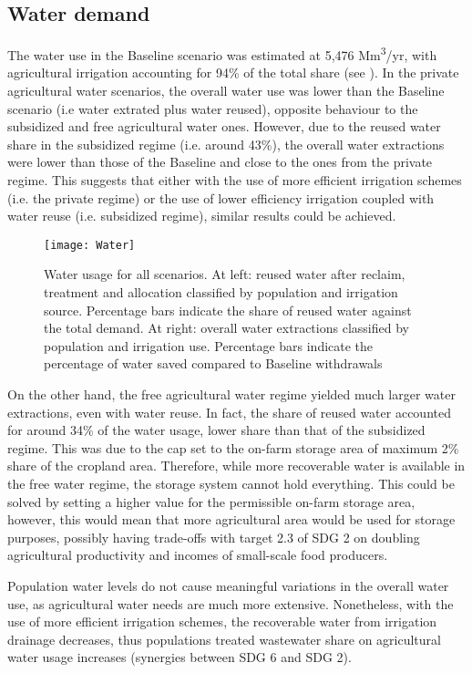 \subsection{Water demand}
The water use in the Baseline scenario was estimated at 5,476 Mm\textsuperscript{3}/yr, with agricultural irrigation accounting for 94\% of the total share (see ). In the private agricultural water scenarios, the overall water use was lower than the Baseline scenario (i.e water extrated plus water reused), opposite behaviour to the subsidized and free agricultural water ones. However, due to the reused water share in the subsidized regime (i.e. around 43\%), the overall water extractions were lower than those of the Baseline and close to the ones from the private regime. This suggests that either with the use of more efficient irrigation schemes (i.e. the private regime) or the use of lower efficiency irrigation coupled with water reuse (i.e. subsidized regime), similar results could be achieved.

\begin{figure*}[!h]
	\centering
	\texttt{[image: Water]}
	\caption{Water usage for all scenarios. At left: reused water after reclaim, treatment and allocation classified by population and irrigation source. Percentage bars indicate the share of reused water against the total demand. At right: overall water extractions classified by population and irrigation use. Percentage bars indicate the percentage of water saved compared to Baseline withdrawals}
	\label{fig:water}
\end{figure*}

On the other hand, the free agricultural water regime yielded much larger water extractions, even with water reuse. In fact, the share of reused water accounted for around 34\% of the water usage, lower share than that of the subsidized regime. This was due to the cap set to the on-farm storage area of maximum 2\% share of the cropland area. Therefore, while more recoverable water is available in the free water regime, the storage system cannot hold everything. This could be solved by setting a higher value for the permissible on-farm storage area, however, this would mean that more agricultural area would be used for storage purposes, possibly having trade-offs with target 2.3 of SDG 2 on doubling agricultural productivity and incomes of small-scale food producers.

Population water levels do not cause meaningful variations in the overall water use, as agricultural water needs are much more extensive. Nonetheless, with the use of more efficient irrigation schemes, the recoverable water from irrigation drainage decreases, thus populations treated wastewater share on agricultural water usage increases (synergies between SDG 6 and SDG 2).

